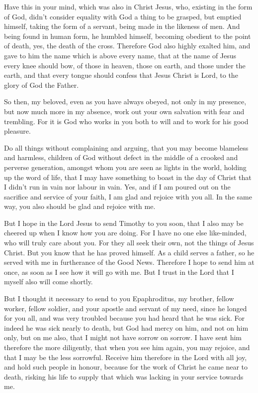  Have this in your mind, which was also in Christ Jesus,
 who, existing in the form of God, didn't consider equality
with God a thing to be grasped,  but emptied himself, taking
the form of a servant, being made in the likeness of men. 
And being found in human form, he humbled himself, becoming obedient to
the point of death, yes, the death of the cross.  Therefore
God also highly exalted him, and gave to him the name which is above
every name,  that at the name of Jesus every knee should
bow, of those in heaven, those on earth, and those under the earth,
 and that every tongue should confess that Jesus Christ is
Lord, to the glory of God the Father.

 So then, my beloved, even as you have always obeyed, not
only in my presence, but now much more in my absence, work out your own
salvation with fear and trembling.  For it is God who works
in you both to will and to work for his good pleasure.

 Do all things without complaining and arguing,
 that you may become blameless and harmless, children of
God without defect in the middle of a crooked and perverse generation,
amongst whom you are seen as lights in the world,  holding
up the word of life, that I may have something to boast in the day of
Christ that I didn't run in vain nor labour in vain.  Yes,
and if I am poured out on the sacrifice and service of your faith, I am
glad and rejoice with you all.  In the same way, you also
should be glad and rejoice with me.

 But I hope in the Lord Jesus to send Timothy to you soon,
that I also may be cheered up when I know how you are doing.
 For I have no one else like-minded, who will truly care
about you.  For they all seek their own, not the things of
Jesus Christ.  But you know that he has proved himself. As
a child serves a father, so he served with me in furtherance of the Good
News.  Therefore I hope to send him at once, as soon as I
see how it will go with me.  But I trust in the Lord that I
myself also will come shortly.

 But I thought it necessary to send to you Epaphroditus, my
brother, fellow worker, fellow soldier, and your apostle and servant of
my need,  since he longed for you all, and was very
troubled because you had heard that he was sick.  For
indeed he was sick nearly to death, but God had mercy on him, and not on
him only, but on me also, that I might not have sorrow on sorrow.
 I have sent him therefore the more diligently, that when
you see him again, you may rejoice, and that I may be the less
sorrowful.  Receive him therefore in the Lord with all joy,
and hold such people in honour,  because for the work of
Christ he came near to death, risking his life to supply that which was
lacking in your service towards me.

